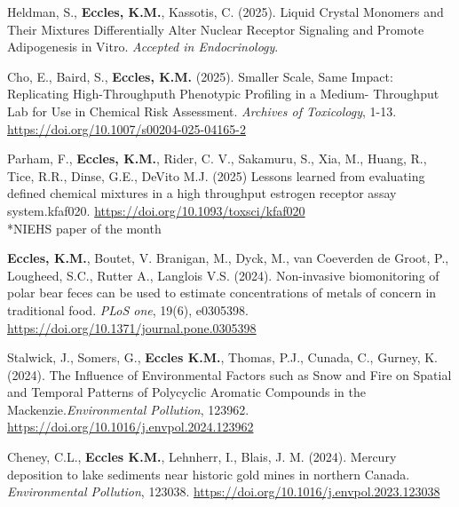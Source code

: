 \documentclass[margin,line]{res}
\begin{document}
\begin{resume}


Heldman, S., \textbf{Eccles, K.M.}, Kassotis, C. (2025). Liquid Crystal Monomers and Their Mixtures Differentially Alter Nuclear Receptor Signaling and Promote Adipogenesis in Vitro. \textit{Accepted in Endocrinology}.

Cho, E., Baird, S., \textbf{Eccles, K.M.} (2025). Smaller Scale, Same Impact: Replicating High-Throughputh Phenotypic Profiling in a Medium- Throughput Lab for Use in Chemical Risk Assessment. \textit{Archives of Toxicology}, 1-13. \url{https://doi.org/10.1007/s00204-025-04165-2}

Parham, F., \textbf{Eccles, K.M.}, Rider, C. V., Sakamuru, S., Xia, M., Huang, R., Tice, R.R., Dinse, G.E., DeVito M.J. (2025) Lessons learned from evaluating defined chemical mixtures in a high throughput estrogen receptor assay system.kfaf020. \url{https://doi.org/10.1093/toxsci/kfaf020}\\
\mbox{*}NIEHS paper of the month

\textbf{Eccles, K.M.}, Boutet, V. Branigan, M., Dyck, M., van Coeverden de Groot, P., Lougheed, S.C., Rutter A., Langlois V.S. (2024). Non-invasive biomonitoring of polar bear feces can be used to estimate concentrations of metals of concern in traditional food. \textit{PLoS one}, 19(6), e0305398. \url{https://doi.org/10.1371/journal.pone.0305398}

Stalwick, J., Somers, G., \textbf{Eccles K.M.}, Thomas, P.J., Cunada, C., Gurney, K. (2024). The Influence of Environmental Factors such as Snow and Fire on Spatial and Temporal Patterns of Polycyclic Aromatic Compounds in the Mackenzie.\textit{Environmental Pollution}, 123962. \url{https://doi.org/10.1016/j.envpol.2024.123962}

Cheney, C.L., \textbf{Eccles K.M.}, Lehnherr, I., Blais, J. M. (2024). Mercury deposition to lake sediments near historic gold mines in northern Canada. \textit{Environmental Pollution}, 123038. \url{https://doi.org/10.1016/j.envpol.2023.123038}


\end{resume}
\end{document}
